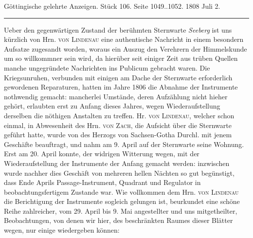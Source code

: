 \clearpage
{}
\hypertarget{native-503-lower}{}\label{native-503-lower}

\begin{center}
\small Göttingische gelehrte Anzeigen. Stück 106. Seite 1049..1052. 1808 Juli 2.\\[3pt]
\rule{.72\linewidth}{.3pt}
\end{center}

Ueber den gegenwärtigen Zustand der berühmten Sternwarte \emph{Seeberg} ist uns kürzlich von Hrn. \textsc{von Lindenau} eine authentische Nachricht in einem besondern Aufsatze zugesandt worden, woraus ein Auszug den Verehrern der Himmelskunde um so willkommner sein wird, da hierüber seit einiger Zeit aus trüben Quellen manche ungegründete Nachrichten ins Publicum gebracht waren. Die Kriegsunruhen, verbunden mit einigen am Dache der Sternwarte erforderlich gewordenen Reparaturen, hatten im Jahre 1806 die Abnahme der Instrumente nothwendig gemacht: mancherlei Umstände, deren Aufzählung nicht hieher gehört, erlaubten erst zu Anfang dieses Jahres, wegen Wiederaufstellung derselben die nöthigen Anstalten zu treffen. Hr. \textsc{von Lindenau}, welcher schon einmal, in Abwesenheit des Hrn. \textsc{von Zach}, die Aufsicht über die Sternwarte geführt hatte, wurde von des Herzogs von Sachsen-Gotha Durchl. mit jenem Geschäfte beauftragt, und nahm am 9. April auf der Sternwarte seine Wohnung. Erst am 20. April konnte, der widrigen Witterung wegen, mit der Wiederaufstellung der Instrumente der Anfang gemacht werden: inzwischen wurde nachher dies Geschäft von mehreren hellen Nächten so gut begünstigt, dass Ende Aprils Passage-Instrument, Quadrant und Regulator in beobachtungsfertigem Zustande war. Wie vollkommen dem Hrn. \textsc{von Lindenau} die Berichtigung der Instrumente sogleich gelungen ist, beurkundet eine schöne Reihe zahlreicher, vom 29. April bis 9. Mai angestellter und uns mitgetheilter, Beobachtungen, von denen wir hier, des beschränkten Raumes dieser Blätter wegen, nur einige wiedergeben können:

